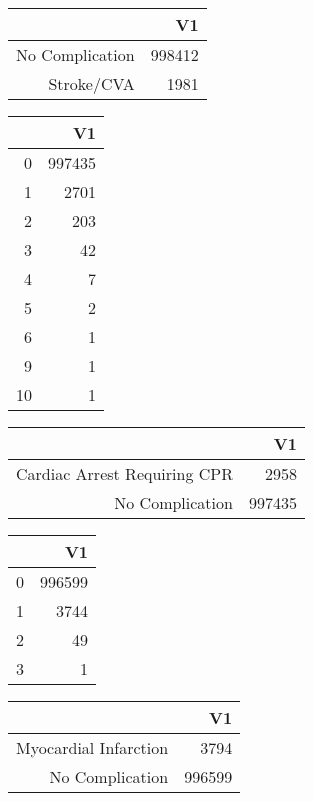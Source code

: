 \bigskip\bigskip
\centering
\begin{tabular}{rr}
  \hline
 & V1 \\ 
  \hline
No Complication & 998412 \\ 
  Stroke/CVA & 1981 \\ 
   \hline
\end{tabular}

\bigskip\bigskip
\centering
\begin{tabular}{rr}
  \hline
 & V1 \\ 
  \hline
0 & 997435 \\ 
  1 & 2701 \\ 
  2 & 203 \\ 
  3 &  42 \\ 
  4 &   7 \\ 
  5 &   2 \\ 
  6 &   1 \\ 
  9 &   1 \\ 
  10 &   1 \\ 
   \hline
\end{tabular}

\bigskip\bigskip
\centering
\begin{tabular}{rr}
  \hline
 & V1 \\ 
  \hline
Cardiac Arrest Requiring CPR & 2958 \\ 
  No Complication & 997435 \\ 
   \hline
\end{tabular}

\bigskip\bigskip
\centering
\begin{tabular}{rr}
  \hline
 & V1 \\ 
  \hline
0 & 996599 \\ 
  1 & 3744 \\ 
  2 &  49 \\ 
  3 &   1 \\ 
   \hline
\end{tabular}

\bigskip\bigskip
\centering
\begin{tabular}{rr}
  \hline
 & V1 \\ 
  \hline
Myocardial Infarction & 3794 \\ 
  No Complication & 996599 \\ 
   \hline
\end{tabular}

